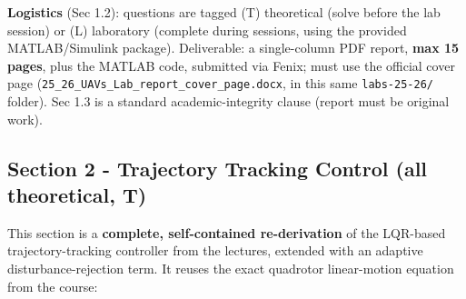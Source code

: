 \documentclass[11pt]{article}
\begin{document}
\textbf{Logistics} (Sec 1.2): questions are tagged (T) theoretical (solve before the lab session) or (L) laboratory (complete during sessions, using the provided MATLAB/Simulink package). Deliverable: a single-column PDF report, \textbf{max 15 pages}, plus the MATLAB code, submitted via Fenix; must use the official cover page (\texttt{25\_\allowbreak{}26\_\allowbreak{}UAVs\_\allowbreak{}Lab\_\allowbreak{}report\_\allowbreak{}cover\_\allowbreak{}page.docx}, in this same \texttt{labs-25-26/} folder). Sec 1.3 is a standard academic-integrity clause (report must be original work).

\subsection{Section 2 - Trajectory Tracking Control (all theoretical, T)}

This section is a \textbf{complete, self-contained re-derivation} of the LQR-based trajectory-tracking controller from the lectures, extended with an adaptive disturbance-rejection term. It reuses the exact quadrotor linear-motion equation from the course:
\end{document}
